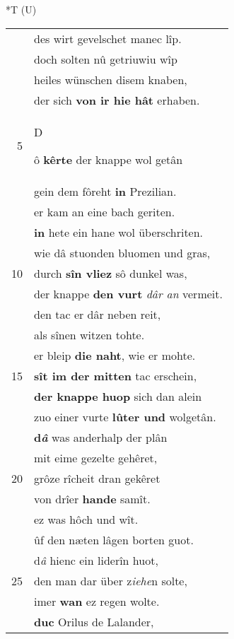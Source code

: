 \documentclass[8pt,a4paper,notitlepage]{article}
\begin{document}
\begin{table}[ht]
\begin{minipage}[t]{0.5\linewidth}
\end{minipage}
\hspace{0.5cm}
\begin{minipage}[t]{0.5\linewidth}
\small
\begin{center}*T (U)
\end{center}
\begin{tabular}{rl}
 & des wirt gevelschet manec lîp.\\ 
 & doch solten nû getriuwiu wîp\\ 
 & heiles wünschen disem knaben,\\ 
 & der sich \textbf{von ir hie hât} erhaben.\\ 
5 & \begin{large}D\end{large}ô \textbf{kêrte} der knappe wol getân\\ 
 & gein dem fôreht \textbf{in} Prezilian.\\ 
 & er kam an eine bach geriten.\\ 
 & \textbf{in} hete ein hane wol überschriten.\\ 
 & wie dâ stuonden bluomen und gras,\\ 
10 & durch \textbf{sîn vliez} sô dunkel was,\\ 
 & der knappe \textbf{den vurt} \textit{dâr an} vermeit.\\ 
 & den tac er dâr neben reit,\\ 
 & als sînen witzen tohte.\\ 
 & er bleip \textbf{die naht}, wie er mohte.\\ 
15 & \textbf{sît im der mitten} tac erschein,\\ 
 & \textbf{der knappe huop} sich dan alein\\ 
 & zuo einer vurte \textbf{lûter und} wolgetân.\\ 
 & \textbf{d\textit{â}} was anderhalp der plân\\ 
 & mit eime gezelte gehêret,\\ 
20 & grôze rîcheit dran gekêret\\ 
 & von drîer \textbf{hande} samît.\\ 
 & ez was hôch und wît.\\ 
 & ûf den næten lâgen borten guot.\\ 
 & d\textit{â} hienc ein liderîn huot,\\ 
25 & den man dar über z\textit{iehe}n solte,\\ 
 & imer \textbf{wan} ez regen wolte.\\ 
 & \textbf{duc} Orilus de Lalander,\\ 

\end{tabular}
\end{minipage}
\end{table}
\end{document}
